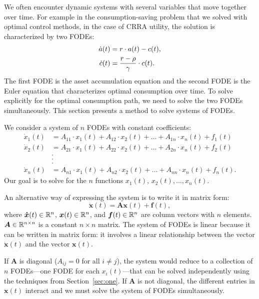 \documentclass[letterpaper,12pt,leqno]{article}
\begin{document}
We often encounter dynamic systems with several variables that move together over time. For example in the consumption-saving problem that we solved with optimal control methods, in the case of CRRA utility, the solution is characterized by two FODEs:
\begin{align*}
\dot{a}(t) &=r\cdot a(t)-c(t), \\
\dot{c}(t) &=\frac{r-\rho}{\gamma}\cdot  c(t).
\end{align*}
The first FODE is the asset accumulation equation and the second FODE is the Euler equation that characterizes optimal consumption over time. To solve explicitly for the optimal consumption path, we need to solve the two FODEs
simultaneously. This section presents a method to solve systems of FODEs.

We consider a system of $n$ FODEs with constant coefficients:
\begin{align*}
\dot{x}_{1}(t) &=A_{11}\cdot x_{1}(t)+A_{12}\cdot x_{2}(t)+\ldots+A_{1n}\cdot x_{n}(t) +f_{1}(t) \\
\dot{x}_{2}(t) &=A_{21}\cdot x_{1}(t)+A_{22}\cdot x_{2}(t)+\ldots+A_{2n}\cdot x_{n}(t) +f_{2}(t) \\
&. \\
&. \\
&. \\
\dot{x}_{n}(t) &=A_{n1}\cdot x_{1}(t)+A_{n2}\cdot x_{2}(t)+\ldots+A_{nn}\cdot x_{n}(t) +f_{n}(t).
\end{align*}
Our goal is to solve for the $n$ functions $x_{1}(t)$, $x_{2}(t),\ldots, x_{n}(t)$.

An alternative way of expressing the system is to write it in matrix form:
\begin{equation}
\bm{\dot{x}}(t) =\bm{A}  \bm{x}(t) +\bm{f}(t), \label{eq:FODEsys}
\end{equation}
where $\bm{\dot{x}}(t) \in \mathbb{R}^{n}$, $\bm{x}(t) \in \mathbb{R}^{n}$, and $\bm{f}(t) \in \mathbb{R}^{n}$ are column vectors with $n$ elements. $\bm{A}\in \mathbb{R}^{n\times n}$ is a constant $n\times n$ matrix. The system of FODEs is linear because it can be written in matrix form: it involves a linear relationship between the vector $\bm{\dot{x}}(t)$ and the vector $\bm{x}(t)$.

If $\bm{A}$ is diagonal ($A_{ij}=0$ for all $i\neq j$), the system would reduce to a collection of $n$ FODEs---one FODE for each  $x_{i}(t)$---that can be solved independently using the techniques from Section~\ref{sec:one}.
If $\bm{A}$ is not diagonal, the different entries in $\bm{x}(t)$ interact and we must solve the system of FODEs simultaneously.
\end{document}
